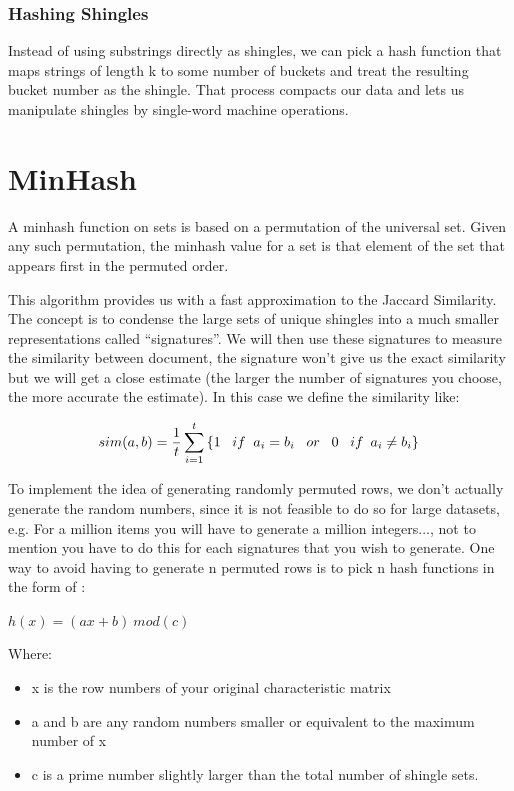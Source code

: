 \documentclass[12pt]{article}
\begin{document}
\subsubsection{Hashing Shingles}

Instead of using substrings directly as shingles, we can pick a hash function that maps strings of length k to some number of buckets and treat the resulting bucket number as the shingle. That process compacts our data and lets us manipulate shingles by single-word machine operations.

\section{MinHash}

A minhash function on sets is based on a permutation of the universal set. Given any such permutation, the minhash value for a set is that element of the set that appears first in the permuted order. 

This algorithm provides us with a fast approximation to the Jaccard Similarity. The concept is to condense the large sets of unique shingles into a much smaller representations called ``signatures''. We will then use these signatures to measure the similarity between document, the signature won't give us the exact similarity but we will get a close estimate (the larger the number of signatures you choose, the more accurate the estimate). In this case we define the similarity like: 
 \medskip

$$  sim(a,b) = \frac{1}{t} \sum_{i=1}^{t}\left\{
1  \; \; \;  if \; \;  a_{i} = b_{i} \\
\; \; \;  or \; \; \;  0 \; \; \;   if\: \;  a_{i} \neq  b_{i} 
\}\right.  $$\medskip


To implement the idea of generating randomly permuted rows, we don't actually generate the random numbers, since it is not feasible to do so for large datasets, e.g. For a million items you will have to generate a million integers..., not to mention you have to do this for each signatures that you wish to generate. One way to avoid having to generate n permuted rows is to pick n hash functions in the form of :
\medbreak
\begin{center}
$ h(x)=(ax+b)\  mod(c)$
\end{center}

Where: 
\begin{itemize}
\item x is the row numbers of your original characteristic matrix
\item a and b are any random numbers smaller or equivalent to the maximum number of x 
\item c is a prime number slightly larger than the total number of shingle sets. 
\end{itemize}
\end{document}
